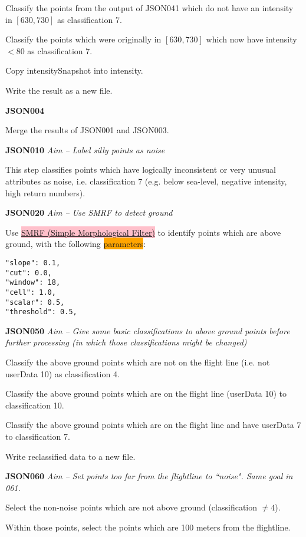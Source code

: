 \documentclass[a4paper,11pt,twoside]{article}
\theoremstyle{definition}
\theoremstyle{remark}
\newcommand{\sh}[1]{\colorbox{pink}{#1}}
\newcommand{\bad}[1]{\colorbox{orange}{#1}}
\begin{document}
\begin{list}{}{}
\item Classify the points from the output of JSON041 which do not have an intensity in $[630,730]$ as classification 7. 
\item Classify the points which were originally in $[630,730]$ which now have intensity $<80$ as classification 7.
\item Copy intensitySnapshot into intensity.
\item Write the result as a new file.
\item \textbf{JSON004}
\item Merge the results of JSON001 and JSON003.
\item \textbf{JSON010}
\emph{Aim -- Label silly points as noise}
\item This step classifies points which have logically inconsistent or very unusual attributes as noise, i.e. classification 7 (e.g. below sea-level, negative intensity, high return numbers). 
\item \textbf{JSON020}
\emph{Aim -- Use SMRF to detect ground}
\item Use \hyperref[smrf]{\sh{SMRF (Simple Morphological Filter)}} to identify points which are above ground, with the following \bad{parameters}:
\begin{center}
\begin{verbatim}
"slope": 0.1, 
"cut": 0.0,
"window": 18, 
"cell": 1.0, 
"scalar": 0.5, 
"threshold": 0.5, 
\end{verbatim}
\end{center}
\item \textbf{JSON050}
\emph{Aim -- Give some basic classifications to above ground points before further processing (in which those classifications might be changed)}
\item Classify the above ground points which are not on the flight line (i.e. not userData 10) as classification 4.
\item Classify the above ground points which are on the flight line (userData 10) to classification 10.
\item Classify the above ground points which are on the flight line and have userData 7 to classification 7.
\item Write reclassified data to a new file.
\item \textbf{JSON060}
\emph{Aim -- Set points too far from the flightline to ``noise". Same goal in 061.}
\item Select the non-noise points which are not above ground (classification $\neq 4$).
\item Within those points, select the points which are 100 meters from the flightline.

\end{list}
\end{document}
